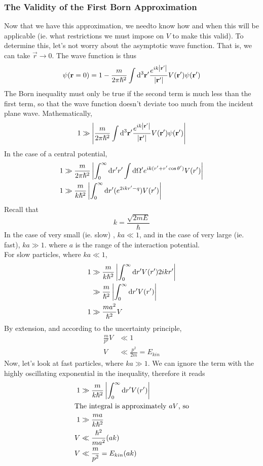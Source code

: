 \documentclass[a4paper]{article}
\begin{document}
\subsubsection{The Validity of the First Born Approximation}
Now that we have this approximation, we needto know how and when this will be
applicable (ie. what restrictions we must impose on $V$ to make this valid). To
determine this, let's not worry about the asymptotic wave function. That is, we
can take $\vec{r} \to 0$. The wave function is thus
\[
	\psi(\boldsymbol{\mathbf{r}}=0) = 1 - \frac{m}{2\pi\hslash^2}
	\int\mathrm{d}^3\boldsymbol{\mathbf{r}}'\frac{e^{ik\left\lvert \boldsymbol{\mathbf{r}}'\right\rvert}}
	{\left\lvert \boldsymbol{\mathbf{r}}'\right\rvert}V(\boldsymbol{\mathbf{r}}')\psi(\boldsymbol{\mathbf{r}}')
\]
The Born inequality must only be true if the second term is much less than the
first term, so that the wave function doesn't deviate too much from the
incident plane wave. Mathematically,
\[
	1 \gg \left\lvert 
	\frac{m}{2\pi\hslash^2}
	\int\mathrm{d}^3\boldsymbol{\mathbf{r}}'\frac{e^{ik\left\lvert \boldsymbol{\mathbf{r}}'\right\rvert}}
	{\left\lvert \boldsymbol{\mathbf{r}}'\right\rvert}V(\boldsymbol{\mathbf{r}}')\psi(\boldsymbol{\mathbf{r}}')\right\rvert
\]
In the case of a central potential,
\begin{align*}
	1 &\gg \frac{m}{2\pi\hslash^2}\left\lvert 
	\int_0^\infty\mathrm{d} r' r' \int\mathrm{d}\Omega' e^{ik(r'+r'\cos\theta')}
	V(r')\right\rvert\\
	1&\gg\frac{m}{k\hslash^2} \left\lvert 
	\int_0^\infty \mathrm{d} r'(e^{2ikr'-q})V(r')\right\rvert
\end{align*}
Recall that
\[
	k = \frac{\sqrt{2mE}}{\hslash}
\]
In the case of very small (ie. slow) , $ka \ll 1$, and in the case of very
large (ie. fast), $ka \gg 1$. where $a$ is the range of the interaction
potential.\\
For slow particles, where $ka \ll 1$,
\begin{align*}
	1 &\gg \frac{m}{k\hslash^2}\left\lvert 
	\int_0^\infty \mathrm{d} r' V(r') 2ikr'\right\rvert\\
	&\gg\frac{m}{\hslash^2}\left\lvert 
	\int_0^\infty\mathrm{d} r' V(r')\right\rvert\\
	1 &\gg \frac{ma^2}{\hslash^2} V
\end{align*}
By extension, and according to the uncertainty principle,
\begin{align*}
	\frac{m}{p^2}V &\ll 1\\
	V &\ll \frac{p^2}{2m} = E_{kin}
\end{align*}
Now, let's look at fast particles, where $ka \gg 1$. We can ignore the term
with the highly oscillating exponential in the inequality, therefore it reads
\begin{align*}
	1 &\gg \frac{m}{k\hslash^2}\left\lvert 
	\int_0^\infty \mathrm{d} r' V(r')\right\rvert\\
	\intertext{The integral is approximately $aV$, so}
	1 &\gg \frac{ma}{k\hslash^2}\\
	V &\ll \frac{\hslash^2}{ma^2}(ak)\\
	V &\ll \frac{m}{p^2} = E_{kin}(ak)
\end{align*}
\end{document}

